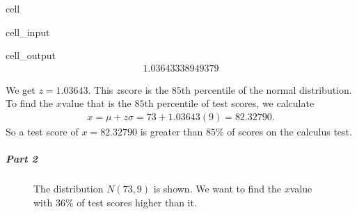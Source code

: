 \documentclass[letterpaper,10pt,english]{jupyterBook}
\begin{document}
\begin{sphinxuseclass}{cell}\begin{sphinxVerbatimInput}

\begin{sphinxuseclass}{cell_input}
\begin{sphinxVerbatim}[commandchars=\\\{\}]
\end{sphinxVerbatim}

\end{sphinxuseclass}\end{sphinxVerbatimInput}
\begin{sphinxVerbatimOutput}

\begin{sphinxuseclass}{cell_output}\begin{equation*}
\begin{split}1.03643338949379\end{split}
\end{equation*}
\end{sphinxuseclass}\end{sphinxVerbatimOutput}

\end{sphinxuseclass}
\sphinxAtStartPar
We get \(z = 1.03643\). This \(z\)\sphinxhyphen{}score is the \(85\)th percentile of the  normal distribution. To find the \(x\)\sphinxhyphen{}value that is the \(85\)th percentile of test scores, we calculate
\begin{equation*}
\begin{split} x = \mu + z\sigma = 73 + 1.03643(9) = 82.32790. \end{split}
\end{equation*}
\sphinxAtStartPar
So a test score of \(x = 82.32790\) is greater than \(85\%\) of scores on the calculus test.


\subparagraph{Part 2}
\label{\detokenize{Ch4 The Normal Distribution and the Central Limit Theorem/4.3 The Normal Distribution and z-scores:id10}}
\begin{figure}[htbp]
\centering
\capstart

\noindent{}
\caption{The distribution \(N(73, 9)\) is shown. We want to find the \(x\)\sphinxhyphen{}value with \(36\%\) of test scores higher than it.}\label{\detokenize{Ch4 The Normal Distribution and the Central Limit Theorem/4.3 The Normal Distribution and z-scores:normal-ex5}}\end{figure}
\end{document}
